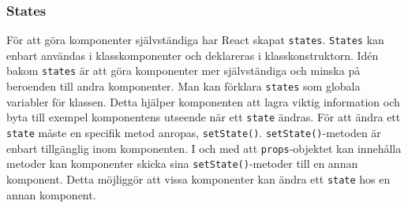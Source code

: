 \subsubsection{States}
\label{axel:react-states} 
För att göra komponenter självständiga har React skapat \texttt{states}.\cite{react-states} \texttt{States} kan enbart användas i klasskomponenter och deklareras i klasskonstruktorn. Idén bakom \texttt{states} är att göra komponenter mer självständiga och minska på beroenden till andra komponenter. Man kan förklara \texttt{states} som globala variabler för klassen. Detta hjälper komponenten att lagra viktig information och byta till exempel komponentens utseende när ett \texttt{state} ändras. För att ändra ett \texttt{state} måste en specifik metod anropas, \texttt{setState()}. \texttt{setState()}-metoden är enbart tillgänglig inom komponenten. I och med att \texttt{props}-objektet kan innehålla metoder kan komponenter skicka sina \texttt{setState()}-metoder till en annan komponent. Detta möjliggör att vissa komponenter kan ändra ett \texttt{state} hos en annan komponent.

